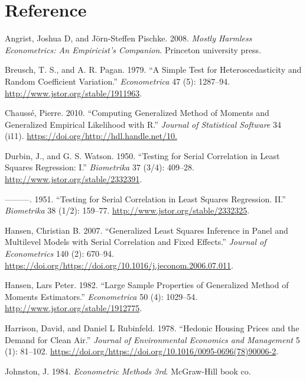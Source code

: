 \documentclass[
  12pt,
]{article}
\newlength{\cslhangindent}
\newenvironment{cslreferences}%
  {\setlength{\parindent}{0pt}%
  \everypar{\setlength{\hangindent}{\cslhangindent}}\ignorespaces}%
  {\par}
\begin{document}
\hypertarget{reference}{%
\section{Reference}\label{reference}}

\hypertarget{refs}{}
\begin{cslreferences}
\leavevmode\hypertarget{ref-angrist2008mostly}{}%
Angrist, Joshua D, and Jörn-Steffen Pischke. 2008. \emph{Mostly Harmless Econometrics: An Empiricist's Companion}. Princeton university press.

\leavevmode\hypertarget{ref-BPG}{}%
Breusch, T. S., and A. R. Pagan. 1979. ``A Simple Test for Heteroscedasticity and Random Coefficient Variation.'' \emph{Econometrica} 47 (5): 1287--94. \url{http://www.jstor.org/stable/1911963}.

\leavevmode\hypertarget{ref-gmmR}{}%
Chaussé, Pierre. 2010. ``Computing Generalized Method of Moments and Generalized Empirical Likelihood with R.'' \emph{Journal of Statistical Software} 34 (i11). \url{https://doi.org/http://hdl.handle.net/10.}

\leavevmode\hypertarget{ref-DW1}{}%
Durbin, J., and G. S. Watson. 1950. ``Testing for Serial Correlation in Least Squares Regression: I.'' \emph{Biometrika} 37 (3/4): 409--28. \url{http://www.jstor.org/stable/2332391}.

\leavevmode\hypertarget{ref-DW2}{}%
---------. 1951. ``Testing for Serial Correlation in Least Squares Regression. II.'' \emph{Biometrika} 38 (1/2): 159--77. \url{http://www.jstor.org/stable/2332325}.

\leavevmode\hypertarget{ref-Hansen2007}{}%
Hansen, Christian B. 2007. ``Generalized Least Squares Inference in Panel and Multilevel Models with Serial Correlation and Fixed Effects.'' \emph{Journal of Econometrics} 140 (2): 670--94. \url{https://doi.org/https://doi.org/10.1016/j.jeconom.2006.07.011}.

\leavevmode\hypertarget{ref-Hansen1982}{}%
Hansen, Lars Peter. 1982. ``Large Sample Properties of Generalized Method of Moments Estimators.'' \emph{Econometrica} 50 (4): 1029--54. \url{http://www.jstor.org/stable/1912775}.

\leavevmode\hypertarget{ref-Boston}{}%
Harrison, David, and Daniel L Rubinfeld. 1978. ``Hedonic Housing Prices and the Demand for Clean Air.'' \emph{Journal of Environmental Economics and Management} 5 (1): 81--102. \url{https://doi.org/https://doi.org/10.1016/0095-0696(78)90006-2}.

\leavevmode\hypertarget{ref-johnston1984econometric}{}%
Johnston, J. 1984. \emph{Econometric Methods 3rd}. McGraw-Hill book co.


\end{cslreferences}
\end{document}
